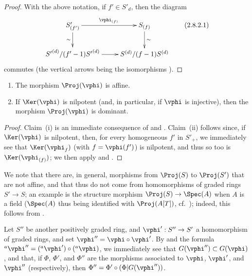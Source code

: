 \begin{proof}
With the above notation, if $f'\in S'_d$, then the diagram
\[
\label{II.2.8.2.1}
  \xymatrix{
    S'_{(f')} \ar[r]^{\vphi_{(f)}} \ar[d]_{\sim}
    & S_{(f)} \ar[d]^{\sim}
  \\{S'}^{(d)}/(f'-1){S'}^{(d)} \ar[r]
    & S^{(d)}/(f-1)S^{(d)}
  }
\tag{2.8.2.1}
\]
commutes (the vertical arrows being the isomorphisms ).
\end{proof}

\begin{corollary}[2.8.3]
\label{II.2.8.3}
\begin{enumerate}
  \item[{\rm(i)}] The morphism $\Proj(\vphi)$ is affine.
  \item[{\rm(ii)}] If $\Ker(\vphi)$ is nilpotent (and, in particular, if $\vphi$ is injective), then the morphism $\Proj(\vphi)$ is dominant.
\end{enumerate}
\end{corollary}

\begin{proof}
Claim~(i) is an immediate consequence of  and .
Claim~(ii) follows since, if $\Ker(\vphi)$ is nilpotent, then, for every homogeneous $f'$ in $S'_+$, we immediately see that $\Ker(\vphi_f)$ (with $f=\vphi(f')$) is nilpotent, and thus so too is $\Ker(\vphi_{(f)})$;
  we then apply  and .
\end{proof}

We note that there are, in general, morphisms from $\Proj(S)$ to $\Proj(S')$ that are not affine, and that thus do not come from homomorphisms of graded rings $S'\to S$;
an example is the structure morphism $\Proj(S)\to\Spec(A)$ when $A$ is a field ($\Spec(A)$ thus being identified with $\Proj(A[T])$, cf.~);
indeed, this follows from .

\begin{env}[2.8.4]
\label{II.2.8.4}
Let $S''$ be another positively graded ring, and $\vphi':S''\to S'$ a homomorphism of graded rings, and set $\vphi''=\vphi\circ\vphi'$.
By  and the formula ${}^a\vphi''=({}^a\vphi')\circ({}^a\vphi)$, we immediately see that $G(\vphi'')\subset G(\vphi)$, and that, if $\Phi$, $\Phi'$, and $\Phi''$ are the morphisms associated to $\vphi$, $\vphi'$, and $\vphi''$ (respectively), then $\Phi''=\Phi'\circ(\Phi|G(\vphi''))$.
\end{env}


